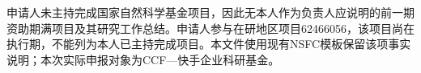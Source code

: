 \justifying
\NSFCBodyText

申请人未主持完成国家自然科学基金项目，因此无本人作为负责人应说明的前一期资助期满项目及其研究工作总结。申请人参与在研地区项目62466056，该项目尚在执行期，不能列为本人已主持完成项目。本文件使用现有NSFC模板保留该项事实说明；本次实际申报对象为CCF—快手企业科研基金。

